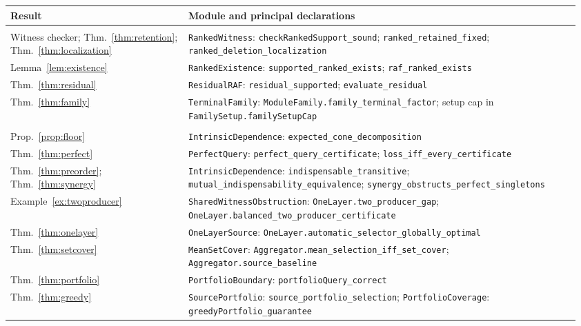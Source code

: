 \documentclass[11pt,a4paper]{article}
\theoremstyle{plain}
\theoremstyle{definition}
\theoremstyle{remark}
\newcommand{\lean}[1]{\texttt{#1}}
\begin{document}
\begin{table}[htbp]
\centering\footnotesize
\renewcommand{\arraystretch}{1.08}
\begin{tabular}{@{}>{\raggedright\arraybackslash}p{0.30\linewidth}>{\raggedright\arraybackslash}p{0.66\linewidth}@{}}
\toprule
Result & Module and principal declarations \\
\midrule
\multicolumn{2}{@{}l}{\emph{Namespace} \lean{RAFQueryCompilation}} \\
Witness checker; Thm.~\ref{thm:retention}; Thm.~\ref{thm:localization} & \lean{RankedWitness}: \lean{checkRankedSupport\_sound}; \lean{ranked\_retained\_fixed}; \lean{ranked\_deletion\_localization} \\
Lemma~\ref{lem:existence} & \lean{RankedExistence}: \lean{supported\_ranked\_exists}; \lean{raf\_ranked\_exists} \\
Thm.~\ref{thm:residual} & \lean{ResidualRAF}: \lean{residual\_supported}; \lean{evaluate\_residual} \\
Thm.~\ref{thm:family} & \lean{TerminalFamily}: \lean{ModuleFamily.family\_terminal\_factor}; setup cap in \lean{FamilySetup.familySetupCap} \\
\midrule
\multicolumn{2}{@{}l}{\emph{Namespace} \lean{RAFSupportSelection}} \\
Prop.~\ref{prop:floor} & \lean{IntrinsicDependence}: \lean{expected\_cone\_decomposition} \\
Thm.~\ref{thm:perfect} & \lean{PerfectQuery}: \lean{perfect\_query\_certificate}; \lean{loss\_iff\_every\_certificate} \\
Thm.~\ref{thm:preorder}; Thm.~\ref{thm:synergy} & \lean{IntrinsicDependence}: \lean{indispensable\_transitive}; \lean{mutual\_indispensability\_equivalence}; \lean{synergy\_obstructs\_perfect\_singletons} \\
Example~\ref{ex:twoproducer} & \lean{SharedWitnessObstruction}: \lean{OneLayer.two\_producer\_gap}; \lean{OneLayer.balanced\_two\_producer\_certificate} \\
Thm.~\ref{thm:onelayer} & \lean{OneLayerSource}: \lean{OneLayer.automatic\_selector\_globally\_optimal} \\
Thm.~\ref{thm:setcover} & \lean{MeanSetCover}: \lean{Aggregator.mean\_selection\_iff\_set\_cover}; \lean{Aggregator.source\_baseline} \\
Thm.~\ref{thm:portfolio} & \lean{PortfolioBoundary}: \lean{portfolioQuery\_correct} \\
Thm.~\ref{thm:greedy} & \lean{SourcePortfolio}: \lean{source\_portfolio\_selection}; \lean{PortfolioCoverage}: \lean{greedyPortfolio\_guarantee} \\

\end{tabular}
\end{table}
\end{document}
